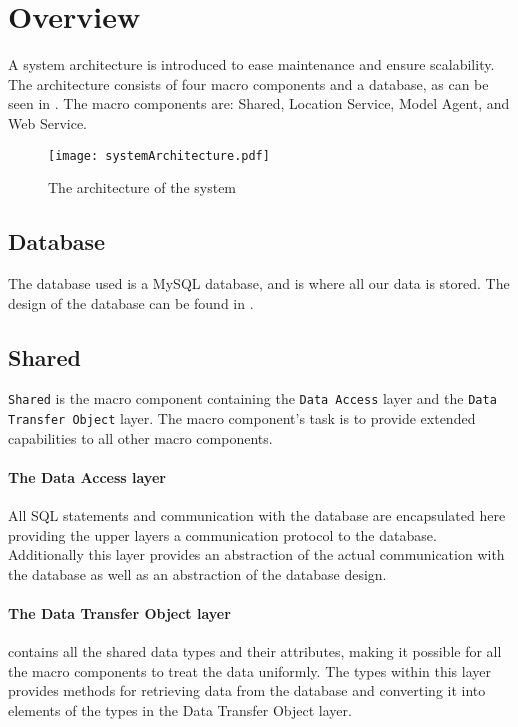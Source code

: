 \section{Overview}
A system architecture is introduced to ease maintenance and ensure scalability.
The architecture consists of four macro components and a database, as can be seen in . The macro components are: Shared, Location Service, Model Agent, and Web Service.

\begin{figure}
\texttt{[image: systemArchitecture.pdf]}
\caption{The architecture of the system}
\label{fig:architecture}
\end{figure}

\subsection{Database} The database used is a MySQL database, and is where all our data is stored.
The design of the database can be found in .

\subsection{Shared}\texttt{Shared} is the macro component containing the \texttt{Data Access} layer and the \texttt{Data Transfer Object} layer.
The macro component's task is to provide extended capabilities to all other macro components.

\paragraph{The Data Access layer} All SQL statements and communication with the database are encapsulated here providing the upper layers a communication protocol to the database.
Additionally this layer provides an abstraction of the actual communication with the database as well as an abstraction of the database design.

\paragraph{The Data Transfer Object layer} contains all the shared data types and their attributes, making it possible for all the macro components to treat the data uniformly.
The types within this layer provides methods for retrieving data from the database and converting it into elements of the types in the Data Transfer Object layer.

